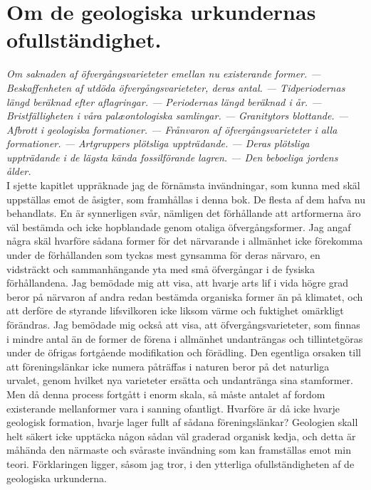 

\chapter[Om urkundernas ofullständighet]{Om de geologiska urkundernas ofullständighet.}

{\it
Om saknaden af öfvergångsvarieteter emellan nu existerande former. — Beskaffenheten af utdöda öfvergångsvarieteter, deras antal. — Tidperiodernas längd beräknad efter aflagringar. — Periodernas längd beräknad i år. — Bristfälligheten i våra palæontologiska samlingar. — Granitytors blottande. — Afbrott i geologiska formationer. — Frånvaron af öfvergångsvarieteter i alla formationer. — Artgruppers plötsliga uppträdande. — Deras plötsliga uppträdande i de lägsta kända fossilförande lagren. — Den beboeliga jordens ålder.
}\\[0.5cm]

I sjette kapitlet uppräknade jag de förnämsta invändningar, som kunna med skäl uppställas emot de åsigter, som framhållas i denna bok. De flesta af dem hafva nu behandlats. En är synnerligen svår, nämligen det förhållande att artformerna äro väl bestämda och icke hopblandade genom otaliga öfvergångsformer. Jag angaf några skäl hvarföre sådana former för det närvarande i allmänhet icke förekomma under de förhållanden som tyckas mest gynsamma för deras närvaro, en vidsträckt och sammanhängande yta med små öfvergångar i de fysiska förhållandena. Jag bemödade mig att visa, att hvarje arts lif i vida högre grad beror på närvaron af andra redan bestämda organiska former än på klimatet, och att derföre de styrande lifsvilkoren icke liksom värme och fuktighet omärkligt förändras. Jag bemödade mig också att visa, att öfvergångsvarieteter, som finnas i mindre antal än de former de förena i allmänhet undanträngas och tillintetgöras under de öfrigas fortgående modifikation och förädling. Den egentliga orsaken till att föreningslänkar icke numera påträffas i naturen beror på det naturliga urvalet, genom hvilket nya varieteter ersätta och undantränga sina stamformer. Men då denna process fortgått i enorm skala, så måste antalet af fordom existerande mellanformer vara i sanning ofantligt. Hvarföre är då icke hvarje geologisk formation, hvarje lager fullt af sådana föreningslänkar? Geologien skall helt säkert icke upptäcka någon sådan väl graderad organisk kedja, och detta är måhända den närmaste och svåraste invändning som kan framställas emot min teori. Förklaringen ligger, såsom jag tror, i den ytterliga ofullständigheten af de geologiska urkunderna.

